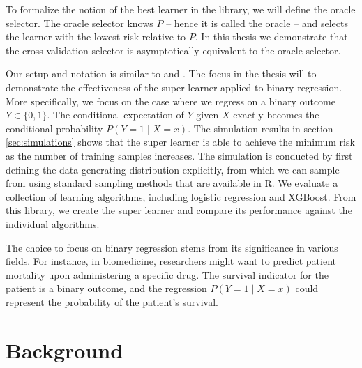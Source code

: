 \documentclass[11pt, a4paper]{article}
\theoremstyle{definition}
\theoremstyle{remark}
\begin{document}
To formalize the notion of the best learner in the library, we will define the oracle selector. The oracle selector knows $ P $ -- hence it is called the oracle -- and selects the learner with the lowest risk relative to $ P $. In this thesis we demonstrate that the cross-validation selector is asymptotically equivalent to the oracle selector. 

Our setup and notation is similar to \cite{vaart06} and \cite{laan03}. The focus in the thesis will to demonstrate the effectiveness of the super learner applied to binary regression. More specifically, we focus on the case where we regress on a binary outcome $ Y \in \{0,1\} $. The conditional expectation of $ Y $ given $ X $ exactly becomes the conditional probability $ P(Y = 1 \mid X = x) $. The simulation results in section \ref{sec:simulations} shows that the super learner is able to achieve the minimum risk as the number of training samples increases. The simulation is conducted by first defining the data-generating distribution explicitly, from which we can sample from using standard sampling methods that are available in R. We evaluate a collection of learning algorithms, including logistic regression and XGBoost. From this library, we create the super learner and compare its performance against the individual algorithms.

The choice to focus on binary regression stems from its significance in various fields. For instance, in biomedicine, researchers might want to predict patient mortality upon administering a specific drug. The survival indicator for the patient is a binary outcome, and the regression $ P(Y = 1 \mid X = x) $ could represent the probability of the patient's survival. 

\section{Background}
\end{document}
